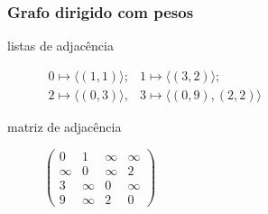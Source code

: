 \documentclass{beamer}
\begin{document}
\begin{frame}
\frametitle{Grafo dirigido com pesos}

\begin{center}
\end{center}

\begin{description}

\item[listas de adjacência] $\begin{array}{ll}
  0 \mapsto \langle (1, 1) \rangle; & 1 \mapsto \langle (3, 2) \rangle; \\
  2 \mapsto \langle (0, 3) \rangle, & 3 \mapsto \langle (0, 9), (2, 2) \rangle
  \end{array}$

\item[matriz de adjacência] $\left( 
\begin{array}{cccc}
0 & 1 & \infty & \infty \\
\infty & 0 & \infty & 2 \\
3 & \infty & 0 & \infty \\
9 & \infty & 2 & 0
\end{array}
\right)
$
\end{description}
\end{frame}
\end{document}
